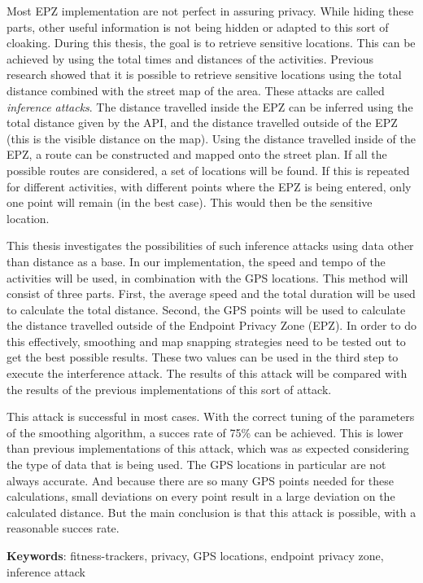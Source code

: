 Most EPZ implementation are not perfect in assuring privacy. While hiding these
parts, other useful information is not being hidden or adapted to this sort of
cloaking. During this thesis, the goal is to retrieve sensitive locations. This
can be achieved by using the total times and distances of the activities.
Previous research showed that it is possible to retrieve sensitive locations
using the total distance combined with the street map of the area. These
attacks are called \textit{inference attacks}. The distance travelled inside
the EPZ can be inferred using the total distance given by the API, and the
distance travelled outside of the EPZ (this is the visible distance on the
map). Using the distance travelled inside of the EPZ, a route can be
constructed and mapped onto the street plan. If all the possible routes are
considered, a set of locations will be found. If this is repeated for different
activities, with different points where the EPZ is being entered, only one
point will remain (in the best case). This would then be the sensitive
location.

This thesis investigates the possibilities of such inference attacks using data
other than distance as a base. In our implementation, the speed and tempo of
the activities will be used, in combination with the GPS locations. This method
will consist of three parts. First, the average speed and the total duration
will be used to calculate the total distance. Second, the GPS points will be
used to calculate the distance travelled outside of the Endpoint Privacy Zone
(EPZ). In order to do this effectively, smoothing and map snapping strategies
need to be tested out to get the best possible results. These two values can be
used in the third step to execute the interference attack. The results of this
attack will be compared with the results of the previous implementations of
this sort of attack.

This attack is successful in most cases. With the correct tuning of the
parameters of the smoothing algorithm, a succes rate of 75\% can be achieved.
This is lower than previous implementations of this attack, which was as
expected considering the type of data that is being used. The GPS locations in
particular are not always accurate. And because there are so many GPS points
needed for these calculations, small deviations on every point result in a
large deviation on the calculated distance. But the main conclusion is that
this attack is possible, with a reasonable succes rate.

\textbf{Keywords}: fitness-trackers, privacy, GPS locations, endpoint privacy zone, inference attack